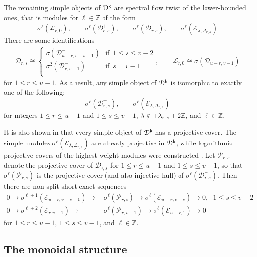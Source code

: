 \documentclass[a4paper, reqno]{amsart}
\theoremstyle{introTheorems}
\def\ZZ{\mathbb{Z}}
\newcommand\cD{\mathcal{D}}
\newcommand\cE{\mathcal{E}}
\newcommand\cL{\mathcal{L}}
\newcommand\cP{\mathcal{P}}
\renewcommand{\1}{\mathbbold{1}}
\begin{document}
The remaining simple objects of $\cD^\k$
are spectral flow twist of the lower-bounded ones, that is modules for $\ell \in \ZZ$ of the form 
\begin{equation*}
\sigma^\ell(\cL_{r,0}),\qquad\sigma^\ell(\cD_{r,s}^+),\qquad\sigma^\ell(\cD_{r,s}^-),\qquad\sigma^\ell(\cE_{\lambda,\Delta_{r,s}})
\end{equation*} 
There are some identifications
\begin{align}\label{eqn:HW-as-SF-of-LW}
\cD_{r,s}^+\cong\begin{cases}
    \sigma(\cD^-_{u-r,v-s-1}) & \text{if}\,\,\,1\leq s\leq v-2\\
    \sigma^2(\cD^-_{r,v-1}) & \text{if}\,\,\, s=v-1\\
\end{cases},\qquad \cL_{r,0}\cong\sigma(\cD_{u-r,v-1}^-)
\end{align}
for $1\leq r\leq u-1$. As a result, any simple object of $\cD^\k$ is isomorphic to exactly one of the following:
\begin{equation*}
    \sigma^\ell(\cD_{r,s}^+),\qquad\sigma^\ell(\cE_{\lambda,\Delta_{r,s}})
\end{equation*}
for integers $1\leq r\leq u-1$ and $1\leq s\leq v-1$, $\lambda\notin\pm\lambda_{r,s}+2\ZZ$, and $\ell\in\ZZ$.

It is also shown in \cite{ACK} that every simple object of $\cD^\k$ has a projective cover. The simple modules $\sigma^\ell(\cE_{\lambda,\Delta_{r,s}})$ are already projective in $\cD^\k$, while
logarithmic projective covers of the highest-weight modules were constructed \cites{A,ACK}. Let $\cP_{r,s}$ denote the projective cover of $\cD_{r,s}^+$ for $1\leq r\leq u-1$ and $1\leq s\leq v-1$, so that 
$\sigma^\ell(\cP_{r, s})$ is the projective cover (and also injective hull) of $\sigma^\ell(\cD^+_{r, s})$. Then there are non-split short exact sequences
\begin{align}
         0 \longrightarrow \sigma^{\ell+1}(\cE^-_{u-r, v-s-1}) \longrightarrow 
        &\, \sigma^{\ell}(\cP_{r, s}) \longrightarrow  \sigma^{\ell}(\cE^-_{u-r, v-s}) \longrightarrow 0, \ \  \ 1\leq s\leq v-2 \\
         0 \longrightarrow \sigma^{\ell+2}(\cE^-_{r, v-1}) \longrightarrow 
        &\,\sigma^{\ell}(\cP_{r, v-1}) \longrightarrow  \sigma^{\ell}(\cE^-_{u-r, 1}) \longrightarrow 0 
\end{align}
for $1\leq r\leq u-1$, $1\leq s\leq v-1$, and $\ell\in\ZZ$.

\subsection{The monoidal structure}\label{subsec:sl2monoidal}
\end{document}
